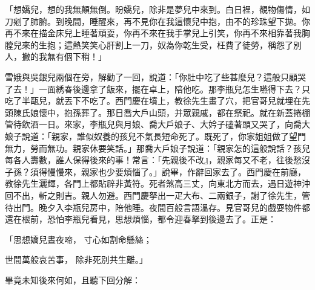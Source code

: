 「想嬌兒，想的我無顛無倒。盼嬌兒，除非是夢兒中來到。白日裡，覩物傷情，如刀剜了肺腑。到晚間，睡醒來，再不見你在我這懷兒中抱，由不的珍珠望下拋。你再不來在描金床兒上睡著頑耍，你再不來在我手掌兒上引笑，你再不來相靠著我胸膛兒來的生抱；這熱笑笑心肝割上一刀，奴為你乾生受，枉費了徒勞，稱怨了別人，撇的我無有個下稍！」

雪娥與吳銀兒兩個在旁，解勸了一回，說道：「你肚中吃了些甚麼兒？這般只顧哭了去！」一面綉春後邊拿了飯來，擺在卓上，陪他吃。那李瓶兒怎生嚥得下去？只吃了半甌兒，就丟下不吃了。西門慶在墳上，教徐先生畫了穴，把官哥兒就埋在先頭陳氏娘懷中，抱孫葬了。那日喬大戶山頭，并眾親戚，都在祭祀。就在新蓋捲棚管待飲酒一日。來家，李瓶兒與月娘、喬大戶娘子、大妗子磕著頭又哭了，向喬大娘子說道：「親家，誰似奴養的孩兒不氣長短命死了。既死了，你家姐姐做了望門無力，勞而無功。親家休要笑話。」那喬大戶娘子說道：「親家怎的這般說話？孩兒每各人壽數，誰人保得後來的事！常言：「先親後不改』，親家每又不老，往後愁沒子孫？須得慢慢來，親家也少要煩惱了。」說畢，作辭回家去了。西門慶在前廳，教徐先生灑輝，各門上都貼辟非黃符。死者煞高三丈，向東北方而去，遇日遊神沖回不出，斬之則吉。親人勿避。西門慶拏出一疋大布、二兩銀子，謝了徐先生，管待出門。晚夕入李瓶兒房中，陪他睡。夜間百般言語溫存。見官哥兒的戲耍物件都還在根前，恐怕李瓶兒看見，思想煩惱，都令迎春拏到後邊去了。正是：

「思想嬌兒晝夜啼，  寸心如割命懸絲；

世間萬般哀苦事，  除非死別共生離。」

畢竟未知後來何如，且聽下回分解：
